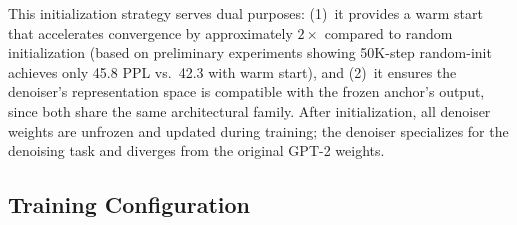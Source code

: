 
This initialization strategy serves dual purposes: (1)~it provides a warm start that accelerates convergence by approximately $2\times$ compared to random initialization (based on preliminary experiments showing 50K-step random-init achieves only 45.8 PPL vs.\ 42.3 with warm start), and (2)~it ensures the denoiser's representation space is compatible with the frozen anchor's output, since both share the same architectural family. After initialization, all denoiser weights are unfrozen and updated during training; the denoiser specializes for the denoising task and diverges from the original GPT-2 weights.

\subsection{Training Configuration}

